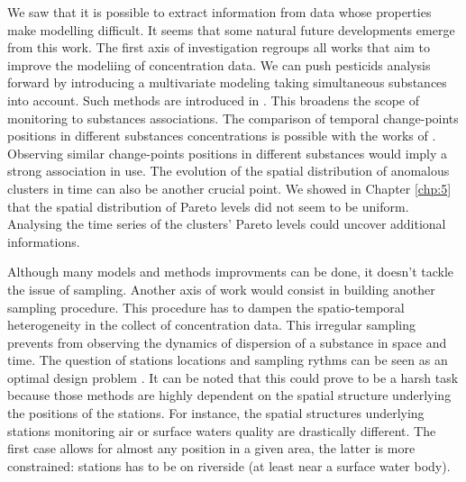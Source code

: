We saw that it is possible to extract information from data whose properties make modelling difficult. It seems that some natural future developments emerge from this work. 
The first axis of investigation regroups all works that aim to improve the modeliing of concentration data. We can push pesticids analysis forward by introducing a multivariate modeling taking simultaneous substances into account. Such methods are introduced in \cite{pickering2016changepoint}. This broadens the scope of monitoring to substances associations. The comparison of temporal change-points positions in different substances concentrations is possible with the works of \cite{Cleynen2014}. Observing similar change-points positions in different substances would imply a strong association in use. The evolution of the spatial distribution of anomalous clusters in time can also be another crucial point. We showed in Chapter \ref{chp:5} that the spatial distribution of Pareto levels did not seem to be uniform. Analysing the time series of the clusters' Pareto levels could uncover additional informations.  
 
Although many models and methods improvments can be done, it doesn't tackle the issue of sampling. Another axis of work would consist in building another sampling procedure. This procedure has to dampen the spatio-temporal heterogeneity in the collect of concentration data. This irregular sampling prevents from observing the dynamics of dispersion of a substance in space and time. The question of stations locations and sampling rythms can be seen as an optimal design problem \cite{Mueller2011,Marsh2012}. It can be noted that this could prove to be a harsh task because those methods are highly dependent on the spatial structure underlying the positions of the stations. For instance, the spatial structures underlying stations monitoring air or surface waters quality are drastically different. The first case allows for almost any position in a given area, the latter is more constrained: stations has to be on riverside (at least near a surface water body).  
